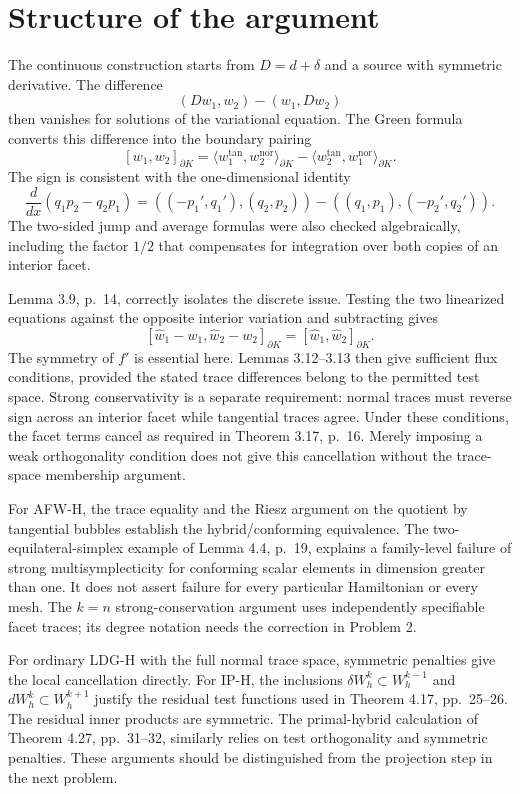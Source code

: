 \documentclass[10pt]{article}
\begin{document}
\section*{Structure of the argument}
The continuous construction starts from \(D=d+\delta\) and a source with symmetric derivative. The difference \[(Dw_1,w_2)-(w_1,Dw_2)\] then vanishes for solutions of the variational equation. The Green formula converts this difference into the boundary pairing \[[w_1,w_2]_{\partial K}
 =\langle w_1^\mathrm{tan},w_2^\mathrm{nor}\rangle_{\partial K}
  -\langle w_2^\mathrm{tan},w_1^\mathrm{nor}\rangle_{\partial K}.\] The sign is consistent with the one-dimensional identity \[\frac{d}{dx}(q_1p_2-q_2p_1)
 =((-p_1',q_1'),(q_2,p_2))
  -((q_1,p_1),(-p_2',q_2')).\] The two-sided jump and average formulas were also checked algebraically, including the factor \(1/2\) that compensates for integration over both copies of an interior facet.\par
Lemma 3.9, p. 14, correctly isolates the discrete issue. Testing the two linearized equations against the opposite interior variation and subtracting gives \[[\widehat w_1-w_1,\widehat w_2-w_2]_{\partial K}
       =[\widehat w_1,\widehat w_2]_{\partial K}.\] The symmetry of \(f'\) is essential here. Lemmas 3.12–3.13 then give sufficient flux conditions, provided the stated trace differences belong to the permitted test space. Strong conservativity is a separate requirement: normal traces must reverse sign across an interior facet while tangential traces agree. Under these conditions, the facet terms cancel as required in Theorem 3.17, p. 16. Merely imposing a weak orthogonality condition does not give this cancellation without the trace-space membership argument.\par
For AFW-H, the trace equality and the Riesz argument on the quotient by tangential bubbles establish the hybrid/conforming equivalence. The two-equilateral-simplex example of Lemma 4.4, p. 19, explains a family-level failure of strong multisymplecticity for conforming scalar elements in dimension greater than one. It does not assert failure for every particular Hamiltonian or every mesh. The \(k=n\) strong-conservation argument uses independently specifiable facet traces; its degree notation needs the correction in Problem 2.\par
For ordinary LDG-H with the full normal trace space, symmetric penalties give the local cancellation directly. For IP-H, the inclusions \(\delta W_h^k\subset W_h^{k-1}\) and \(dW_h^k\subset W_h^{k+1}\) justify the residual test functions used in Theorem 4.17, pp. 25–26. The residual inner products are symmetric. The primal-hybrid calculation of Theorem 4.27, pp. 31–32, similarly relies on test orthogonality and symmetric penalties. These arguments should be distinguished from the projection step in the next problem.\par
\end{document}
